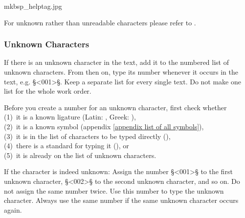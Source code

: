\begin{sampleImage}{mkbsp_helptag.jpg}

\end{sampleImage}

\begin{crossref}
For unknown rather than unreadable characters please refer to .
\end{crossref}


\subsubsection{Unknown Characters}
\label{section unknown characters}

\begin{mainrule}
If there is an unknown character in the text, add it to the numbered
list of unknown characters. From then on, type its number whenever it
occurs in the text, e.g. §<001>§. Keep a separate list for every
single text. Do not make one list for the whole work order.
\end{mainrule}

\begin{clarification}
Before you create a number for an unknown character, first check whether \\
(1)~it is a known ligature (Latin: , Greek: ), \\
(2)~it is a known symbol (appendix \ref{appendix list of all symbols}), \\
(3)~it is in the list of characters to be typed directly (), \\
(4)~there is a standard for typing it (), or \\
(5)~it is already on the list of unknown characters.
 \end{clarification}

\begin{clarification}
If the character is indeed unknown: Assign the number §<001>§ to the first unknown character, §<002>§ to the second unknown character, and so on. Do not assign the same number twice. Use this number to type the unknown character. Always use the same number if the same unknown character occurs again.
\end{clarification}


